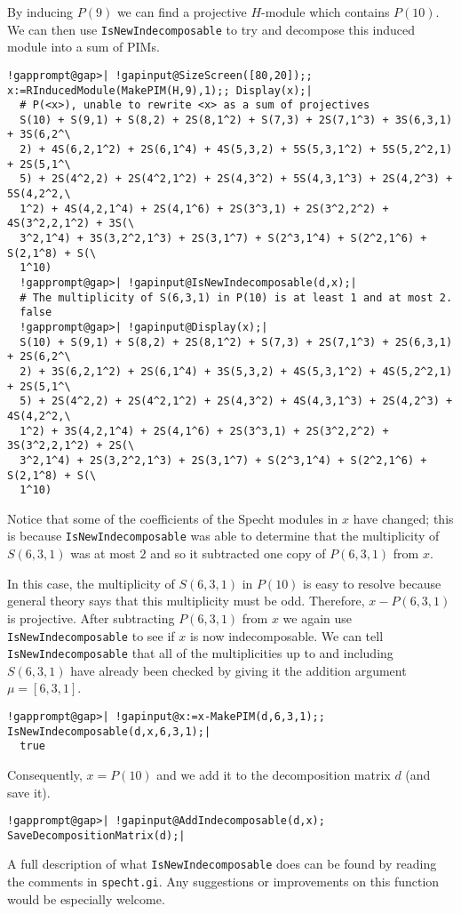 \documentclass[a4paper,11pt]{report}
\begin{document}
{{{ By inducing $P(9)$ we can find a projective $H$-module which contains $P(10)$. We can then use \texttt{IsNewIndecomposable} to try and decompose this induced module into a sum of PIMs. 
\begin{Verbatim}[commandchars=!@|,fontsize=\small,frame=single,label=Example]
  !gapprompt@gap>| !gapinput@SizeScreen([80,20]);; x:=RInducedModule(MakePIM(H,9),1);; Display(x);|
  # P(<x>), unable to rewrite <x> as a sum of projectives
  S(10) + S(9,1) + S(8,2) + 2S(8,1^2) + S(7,3) + 2S(7,1^3) + 3S(6,3,1) + 3S(6,2^\
  2) + 4S(6,2,1^2) + 2S(6,1^4) + 4S(5,3,2) + 5S(5,3,1^2) + 5S(5,2^2,1) + 2S(5,1^\
  5) + 2S(4^2,2) + 2S(4^2,1^2) + 2S(4,3^2) + 5S(4,3,1^3) + 2S(4,2^3) + 5S(4,2^2,\
  1^2) + 4S(4,2,1^4) + 2S(4,1^6) + 2S(3^3,1) + 2S(3^2,2^2) + 4S(3^2,2,1^2) + 3S(\
  3^2,1^4) + 3S(3,2^2,1^3) + 2S(3,1^7) + S(2^3,1^4) + S(2^2,1^6) + S(2,1^8) + S(\
  1^10)
  !gapprompt@gap>| !gapinput@IsNewIndecomposable(d,x);|
  # The multiplicity of S(6,3,1) in P(10) is at least 1 and at most 2.
  false
  !gapprompt@gap>| !gapinput@Display(x);|
  S(10) + S(9,1) + S(8,2) + 2S(8,1^2) + S(7,3) + 2S(7,1^3) + 2S(6,3,1) + 2S(6,2^\
  2) + 3S(6,2,1^2) + 2S(6,1^4) + 3S(5,3,2) + 4S(5,3,1^2) + 4S(5,2^2,1) + 2S(5,1^\
  5) + 2S(4^2,2) + 2S(4^2,1^2) + 2S(4,3^2) + 4S(4,3,1^3) + 2S(4,2^3) + 4S(4,2^2,\
  1^2) + 3S(4,2,1^4) + 2S(4,1^6) + 2S(3^3,1) + 2S(3^2,2^2) + 3S(3^2,2,1^2) + 2S(\
  3^2,1^4) + 2S(3,2^2,1^3) + 2S(3,1^7) + S(2^3,1^4) + S(2^2,1^6) + S(2,1^8) + S(\
  1^10)
\end{Verbatim}
 Notice that some of the coefficients of the Specht modules in $x$ have changed; this is because \texttt{IsNewIndecomposable} was able to determine that the multiplicity of $S(6,3,1)$ was at most $2$ and so it subtracted one copy of $P(6,3,1)$ from $x$.

 In this case, the multiplicity of $S(6,3,1)$ in $P(10)$ is easy to resolve because general theory says that this multiplicity must be
odd. Therefore, $x-P(6,3,1)$ is projective. After subtracting $P(6,3,1)$ from $x$ we again use \texttt{IsNewIndecomposable} to see if $x$ is now indecomposable. We can tell \texttt{IsNewIndecomposable} that all of the multiplicities up to and including $S(6,3,1)$ have already been checked by giving it the addition argument $\mu=[6,3,1]$. 
\begin{Verbatim}[commandchars=!@|,fontsize=\small,frame=single,label=Example]
  !gapprompt@gap>| !gapinput@x:=x-MakePIM(d,6,3,1);; IsNewIndecomposable(d,x,6,3,1);|
  true
\end{Verbatim}
 Consequently, $x=P(10)$ and we add it to the decomposition matrix $d$ (and save it). 
\begin{Verbatim}[commandchars=!@|,fontsize=\small,frame=single,label=Example]
  !gapprompt@gap>| !gapinput@AddIndecomposable(d,x); SaveDecompositionMatrix(d);|
\end{Verbatim}
 A full description of what \texttt{IsNewIndecomposable} does can be found by reading the comments in \texttt{specht.gi}. Any suggestions or improvements on this function would be especially
welcome.

}}}
\end{document}
